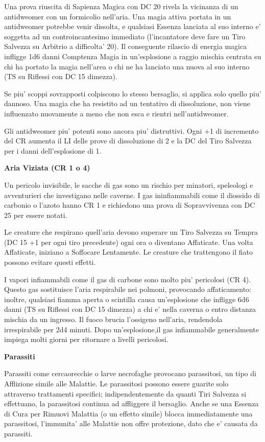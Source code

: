\documentclass[a4paper,11pt,twoside,openany]{book}
\begin{document}
{Una prova riuscita di Sapienza Magica con DC 20 rivela la vicinanza di un antidweomer con un formicolio nell'aria. Una magia attiva portata in un antidweomer potrebbe venir dissolta, e qualsiasi Essenza lanciata al suo interno e' soggetta ad un controincantesimo immediato (l'incantatore deve fare un Tiro Salvezza su Arbitrio a difficolta' 20). Il conseguente rilascio di energia magica infligge 1d6 danni Comptenza Magia in un'esplosione a raggio mischia centrata su chi ha portato la magia nell'area o chi ne ha lanciato una nuova al suo interno (TS su Riflessi con DC 15 dimezza).

Se piu' scoppi sovrapposti colpiscono lo stesso bersaglio, si applica solo quello piu' dannoso. Una magia che ha resistito ad un tentativo di dissoluzione, non viene influenzato nuovamente a meno che non esca e rientri nell'antidweomer.

Gli antidweomer piu' potenti sono ancora piu' distruttivi. Ogni +1 di incremento del CR aumenta il LI delle prove di dissoluzione di 2 e la DC del Tiro Salvezza per i danni dell'esplosione di 1.

\textbf{Aria Viziata (CR 1 o 4)}

Un pericolo invisibile, le sacche di gas sono un rischio per minatori, speleologi e avventurieri che investigano nelle caverne. I gas ininfiammabili come il diossido di carbonio o l'azoto hanno CR 1 e richiedono una prova di Sopravvivenza con DC 25 per essere notati. 

Le creature che respirano quell'aria devono superare un Tiro Salvezza su Tempra (DC 15 +1 per ogni tiro precedente) ogni ora o diventano Affaticate. Una volta Affaticate, iniziano a Soffocare Lentamente. Le creature che trattengono il fiato possono evitare questi effetti.

I vapori infiammabili come il gas di carbone sono molto piu' pericolosi (CR 4). Questo gas sostituisce l'aria respirabile nei polmoni, provocando affaticamento: inoltre, qualsiasi fiamma aperta o scintilla causa un'esplosione che infligge 6d6 danni (TS su Riflessi con DC 15 dimezza) a chi e' nella caverna o entro distanza mischia da un ingresso. Il fuoco brucia l'ossigeno nell'aria, rendendola irrespirabile per 2d4 minuti. Dopo un'esplosione,il gas infiammabile generalmente impiega molti giorni per ritornare a livelli pericolosi.

\textbf{Parassiti}

Parassiti come cercaorecchie o larve necrofaghe provocano parassitosi, un tipo di Afflizione simile alle Malattie. Le parassitosi possono essere guarite solo attraverso trattamenti specifici; indipendentemente da quanti Tiri Salvezza si effettuano, la parassitosi continua ad affliggere il bersaglio. Anche se una Essenza di Cura per Rimuovi Malattia (o un effetto simile) blocca immediatamente una parassitosi, l'immunita' alle Malattie non offre protezione, dato che e' causata da parassiti.

}
\end{document}
